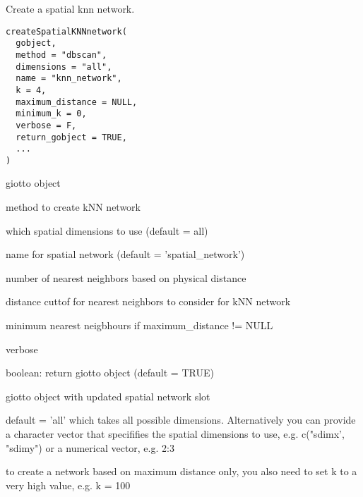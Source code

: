 \documentclass[a4paper]{book}
\begin{document}
%
\begin{Description}\relax
Create a spatial knn network.
\end{Description}
%
\begin{Usage}
\begin{verbatim}
createSpatialKNNnetwork(
  gobject,
  method = "dbscan",
  dimensions = "all",
  name = "knn_network",
  k = 4,
  maximum_distance = NULL,
  minimum_k = 0,
  verbose = F,
  return_gobject = TRUE,
  ...
)
\end{verbatim}
\end{Usage}
%
\begin{Arguments}
\begin{ldescription}
\item[\code{gobject}] giotto object

\item[\code{method}] method to create kNN network

\item[\code{dimensions}] which spatial dimensions to use (default = all)

\item[\code{name}] name for spatial network (default = 'spatial\_network')

\item[\code{k}] number of nearest neighbors based on physical distance

\item[\code{maximum\_distance}] distance cuttof for nearest neighbors to consider for kNN network

\item[\code{minimum\_k}] minimum nearest neigbhours if maximum\_distance != NULL

\item[\code{verbose}] verbose

\item[\code{return\_gobject}] boolean: return giotto object (default = TRUE)
\end{ldescription}
\end{Arguments}
%
\begin{Value}
giotto object with updated spatial network slot

 default = 'all' which takes all possible dimensions.
Alternatively you can provide a character vector that specififies the spatial dimensions to use, e.g. c("sdimx', "sdimy")
or a numerical vector, e.g. 2:3

 to create a network based on maximum distance only, you also need to set k to a very high value, e.g. k = 100
\end{Value}
\end{document}
